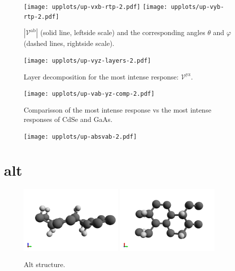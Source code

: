 \documentclass{article}
\let\Oldsection\section
\renewcommand{\section}{\FloatBarrier\Oldsection}
\begin{document}
\begin{figure}[ht]
    \centering
    \texttt{[image: upplots/up-vxb-rtp-2.pdf]}
    \texttt{[image: upplots/up-vyb-rtp-2.pdf]}
    \caption{$|\mathcal{V}^{\mathrm{ab}}|$ (solid line, leftside scale) and the
    corresponding angles $\theta$ and $\varphi$ (dashed lines, rightside scale).}
    \label{fig:up-rtp2}
\end{figure}

\begin{figure}[ht]
    \centering
    \texttt{[image: upplots/up-vyz-layers-2.pdf]}
    \caption{Layer decomposition for the most intense response:
    $\mathcal{V}^{\mathrm{yz}}$.}
    \label{fig:up-lay2}
\end{figure}

\begin{figure}[ht]
    \centering
    \texttt{[image: upplots/up-vab-yz-comp-2.pdf]}
    \caption{Comparisson of the most intense response vs the most intense
    responses of CdSe and GaAs.}
    \label{fig:up-comp2}
\end{figure}

\begin{figure}[h]
    \centering
    \texttt{[image: upplots/up-absvab-2.pdf]}
    \label{fig:up-xbybcomp-2}
\end{figure}




\section{alt} %
\label{sec:alt}

\begin{figure}[h]
    \centering
    \includegraphics[width=0.45\textwidth]{../alt/alt-figures/alt-1}
    \includegraphics[width=0.45\textwidth]{../alt/alt-figures/alt-2}
    \caption{Alt structure.}
    \label{fig:altstruc}
\end{figure}
\end{document}
